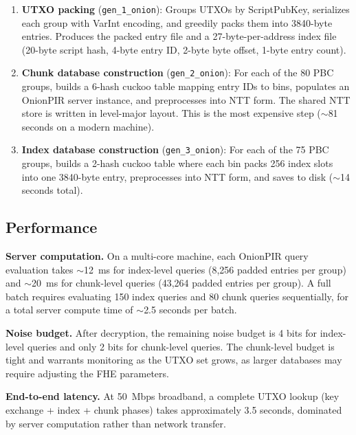 \begin{enumerate}[nolistsep,leftmargin=*]
    \item \textbf{UTXO packing} (\texttt{gen\_1\_onion}): Groups UTXOs by ScriptPubKey, serializes each group with VarInt encoding, and greedily packs them into 3840-byte entries. Produces the packed entry file and a 27-byte-per-address index file (20-byte script hash, 4-byte entry ID, 2-byte byte offset, 1-byte entry count).

    \item \textbf{Chunk database construction} (\texttt{gen\_2\_onion}): For each of the 80 PBC groups, builds a 6-hash cuckoo table mapping entry IDs to bins, populates an OnionPIR server instance, and preprocesses into NTT form. The shared NTT store is written in level-major layout. This is the most expensive step ($\sim$81 seconds on a modern machine).

    \item \textbf{Index database construction} (\texttt{gen\_3\_onion}): For each of the 75 PBC groups, builds a 2-hash cuckoo table where each bin packs 256 index slots into one 3840-byte entry, preprocesses into NTT form, and saves to disk ($\sim$14 seconds total).
\end{enumerate}

\subsection{Performance}
\label{sec:onion-perf}

\textbf{Server computation.} On a multi-core machine, each OnionPIR query evaluation takes $\sim$12~ms for index-level queries (8,256 padded entries per group) and $\sim$20~ms for chunk-level queries (43,264 padded entries per group). A full batch requires evaluating 150 index queries and 80 chunk queries sequentially, for a total server compute time of $\sim$2.5 seconds per batch.

\textbf{Noise budget.} After decryption, the remaining noise budget is 4 bits for index-level queries and only 2 bits for chunk-level queries. The chunk-level budget is tight and warrants monitoring as the UTXO set grows, as larger databases may require adjusting the FHE parameters.

\textbf{End-to-end latency.} At 50~Mbps broadband, a complete UTXO lookup (key exchange + index + chunk phases) takes approximately 3.5 seconds, dominated by server computation rather than network transfer.
